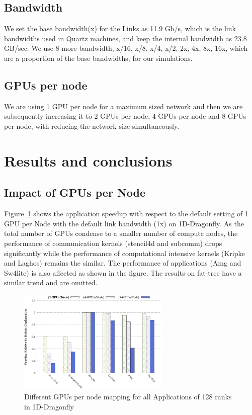 \documentclass[conference]{IEEEtran}
\begin{document}
\subsection{Bandwidth}

We set the base bandwidth(x) for the Links as 11.9 Gb/s, which is the link
bandwidths used in Quartz machines, and keep the internal bandwidth as 23.8 GB/sec.
We use 8 more bandwidth, x/16, x/8, x/4, x/2, 2x, 4x, 8x, 16x,  which are a proportion
of the base bandwidths, for our simulations.

\subsection{GPUs per node}
 
We are using 1 GPU per node for a maximum sized network and then we are subsequently
increasing it to 2 GPUs per node, 4 GPUs per node and 8 GPUs per node, with
reducing the network size simultaneously. 

\section{Results and conclusions}

\subsection{Impact of GPUs per Node}\label{AA}

Figure~\ref{gpu1} shows the application speedup with respect to the default setting of
1 GPU per Node with the default link bandwidth (1x) on 1D-Dragonfly. As the total number of
GPUs condense to a smaller number of compute nodes, the performance of communication kernels
(stencil4d and subcomm)
drops significantly while the performance of computational intensive kernels
(Kripke and Laghos) remains the similar. The performance of applications (Amg and Sw4lite)
is also affected as shown in the figure. The results on fat-tree have a similar trend
and are omitted. 

\begin{figure}[H]
\centering
\centering
\includegraphics[width=1\linewidth, height=5cm]{figs/dfly-x-mapping-all.eps}
\vspace{-0.15in}
\caption{Different GPUs per node mapping for all Applications of 128 ranks in 1D-Dragonfly}
\label{gpu1}
\end{figure}
\end{document}
